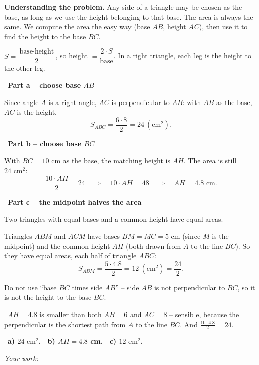 \documentclass[11pt]{article}
\newif\ifsol \solfalse
\providecommand{\AnsWord}{Đáp số}
\newcommand{\StuProb}[2]{\begin{probboxS}{#1}{#2}\StuProbBody\end{probboxS}}
\newcommand{\ans}[1]{\par\smallskip{\bfseries\color{tmGreen!88!black}\AnsWord:}\ {\bfseries\color{AnsRed}#1}\par}
\newcommand{\probsol}[1]{%
  \begin{lrbox}{\solmeasure}\begin{minipage}{\dimexpr\linewidth-24pt\relax}#1\end{minipage}\end{lrbox}%
  \ifsol
    \begin{solbox}#1\end{solbox}%
  \else
    \setlength{\solht}{\dimexpr\ht\solmeasure+\dp\solmeasure+0.85cm\relax}%
    \ifdim\solht<1.35cm\setlength{\solht}{1.35cm}\fi
    \ifdim\solht>\StudentMaxWork\setlength{\solht}{\StudentMaxWork}\fi
    \par\noindent\begin{minipage}{\linewidth}%
    \expandafter\StuProb\StuProbArgs
    \begin{tcolorbox}[colback=white,colframe=Line,boxrule=0.8pt,arc=5pt,
      left=8pt,right=8pt,top=4pt,bottom=4pt,height=\solht]{\footnotesize\color{Slate}\itshape\WorkWord}\end{tcolorbox}%
    \end{minipage}\par\medskip
  \fi}
\newlength{\StudentMaxWork}\setlength{\StudentMaxWork}{4.5cm}
\newcommand{\step}[2]{\par\smallskip\noindent{\bfseries\color{tmBlue!85!black}\StepWord~#1.}\ {\bfseries #2}\par\nopagebreak}
\newcommand{\verify}[1]{\par\smallskip\noindent{\bfseries\color{tmGreen!80!black}\faCheckCircle\ \CheckWord}\ #1\par}
\def\WorkWord{Your work:}
\def\AnsWord{Answer}
\def\StepWord{Step}
\def\CheckWord{Check:}
\begin{document}
\probsol{
\textbf{Understanding the problem.} Any side of a triangle may be chosen as the base, as long as we use the height belonging to that base. The area is always the same. We compute the area the easy way (base $AB$, height $AC$), then use it to find the height to the base $BC$.
\begin{recallbox}$S=\dfrac{\text{base}\cdot\text{height}}{2}$, so height $=\dfrac{2\cdot S}{\text{base}}$. In a right triangle, each leg is the height to the other leg.\end{recallbox}
\step{1}{Part a -- choose base $AB$}
Since angle $A$ is a right angle, $AC$ is perpendicular to $AB$: with $AB$ as the base, $AC$ is the height.
\[ S_{ABC}=\frac{6\cdot8}{2}=24\ (\text{cm}^2). \]

\step{2}{Part b -- choose base $BC$}
With $BC=10$ cm as the base, the matching height is $AH$. The area is still $24\text{ cm}^2$:
\[ \frac{10\cdot AH}{2}=24\quad\Rightarrow\quad 10\cdot AH=48\quad\Rightarrow\quad AH=4.8\text{ cm}. \]

\step{3}{Part c -- the midpoint halves the area}
\begin{recallbox}Two triangles with equal bases and a common height have equal areas.\end{recallbox}
Triangles $ABM$ and $ACM$ have bases $BM=MC=5$ cm (since $M$ is the midpoint) and the common height $AH$ (both drawn from $A$ to the line $BC$). So they have equal areas, each half of triangle $ABC$:
\[ S_{ABM}=\frac{5\cdot4.8}{2}=12\ (\text{cm}^2)=\frac{24}{2}. \]
\begin{warnbox}Do not use ``base $BC$ times side $AB$'' -- side $AB$ is not perpendicular to $BC$, so it is not the height to the base $BC$.\end{warnbox}
\verify{$AH=4.8$ is smaller than both $AB=6$ and $AC=8$ -- sensible, because the perpendicular is the shortest path from $A$ to the line $BC$. And $\frac{10\cdot4.8}{2}=24$.}
\ans{a) $24\text{ cm}^2$. \ b) $AH=4.8$ cm. \ c) $12\text{ cm}^2$.}
}

\providecommand{\tbGrid}[4]{\begin{tikzpicture}[baseline=0.2cm,x=0.5cm,y=0.5cm]
  \draw[Ink,line width=0.7pt] (0,0) grid[step=1] (2,2);
  \node[font=\sffamily\bfseries,text=tmBlue!80!black,inner sep=0pt,#4] at (#1,#2) {#3};\end{tikzpicture}}
\providecommand{\rvbbG}[6]{\draw[Ink,line width=0.7pt] (#1,#2) rectangle ++(1,1)
  ({#1+0.5},#2)--++(0,1) (#1,{#2+0.5})--++(1,0);
  \node[font=\sffamily\bfseries,text=tmBlue!80!black,inner sep=0pt,#6] at ({#1+#3},{#2+#4}) {#5};}
\end{document}
